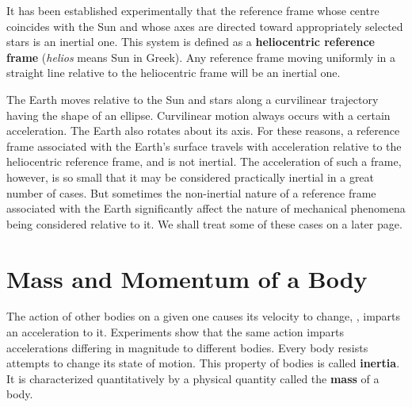 It has been established experimentally that the reference frame whose centre coincides with the Sun and whose axes are directed toward appropriately selected stars is an inertial one. This system is defined as a \textbf{heliocentric reference frame} (\textit{helios} means Sun in Greek). Any reference frame moving uniformly in a straight line relative to the heliocentric frame will be an inertial one.

The Earth moves relative to the Sun and stars along a curvilinear trajectory having the shape of an ellipse. Curvilinear motion always occurs with a certain acceleration. The Earth also rotates about its axis. For these reasons, a reference frame associated with the Earth's surface travels with acceleration relative to the heliocentric reference frame, and is not inertial. The acceleration of such a frame, however, is so small that it may be considered practically inertial in a great number of cases. But sometimes the non-inertial nature of a reference frame associated with the Earth significantly affect the nature of mechanical phenomena being considered relative to it. We shall treat some of these cases on a later page.

\section{Mass and Momentum of a Body}\label{sec:2_3}

The action of other bodies on a given one causes its velocity to change, \ie, imparts an acceleration to it. Experiments show that the same action imparts accelerations differing in magnitude to different bodies. Every body resists attempts to change its state of motion. This property of bodies is called \textbf{inertia}. It is characterized quantitatively by a physical quantity called the \textbf{mass} of a body.

